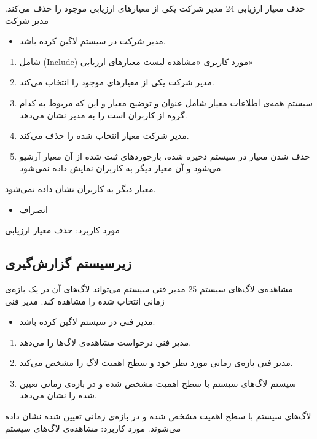 {
\usecase
{
حذف معیار ارزیابی
}
{24}
{
	مدیر شرکت یکی از معیارهای ارزیابی موجود را حذف می‌کند.
}
{
	مدیر شرکت
}
{}
{
	\begin{itemize}
		\vspace*{-0.6cm}
		\item 
		مدیر شرکت در سیستم لاگین کرده باشد.
	\end{itemize}
}
{
	\begin{enumerate}
	\item 
	شامل (Include) مورد کاربری «مشاهده لیست معیارهای ارزیابی»
	\item
	مدیر شرکت یکی از معیارهای موجود را انتخاب می‌کند.
	\item 
	سیستم همه‌ی اطلاعات معیار شامل عنوان و توضیح معیار و این که مربوط به کدام گروه از کاربران است را به مدیر نشان می‌دهد.
	\item 
 مدیر شرکت معیار انتخاب شده را حذف می‌کند.
	\item 
حذف شدن معیار در سیستم ذخیره شده، بازخوردهای ثبت شده از آن معیار آرشیو می‌شود و آن معیار دیگر به کاربران نمایش داده نمی‌شود.
\end{enumerate}
}
{
معیار دیگر به کاربران نشان داده نمی‌شود.
}
{
	\begin{itemize}
		\vspace*{-0.6cm}
		\item 
		انصراف
	\end{itemize}
}
{
	مورد کاربرد: حذف معیار ارزیابی
}



}

\newpage
\subsection{زیرسیستم گزارش‌گیری}


{
\usecase
{
	مشاهده‌ی لاگ‌های سیستم
}
{25}
{
مدیر فنی سیستم می‌تواند لاگ‌های آن در یک بازه‌ی زمانی انتخاب شده را مشاهده کند.
}
{
	مدیر فنی
}
{}
{
	\begin{itemize}
		\vspace*{-0.6cm}
		\item 
مدیر فنی در سیستم لاگین کرده باشد.
	\end{itemize}
}
{
	\vspace*{-0.6cm}
	\begin{enumerate}
		\item 
مدیر فنی درخواست مشاهده‌ی لاگ‌ها را می‌دهد.
		\item
		مدیر فنی بازه‌ی زمانی مورد نظر خود و سطح اهمیت لاگ را مشخص می‌کند.
		\item
		سیستم لاگ‌های سیستم با سطح اهمیت مشخص شده و در بازه‌ی زمانی تعیین شده را نشان می‌دهد.		
	\end{enumerate}
}
{
لاگ‌های سیستم با سطح اهمیت مشخص شده و در بازه‌ی زمانی تعیین شده نشان داده می‌شوند.
}
{
}
{
	مورد کاربرد: مشاهده‌ی لاگ‌های سیستم
}
}

